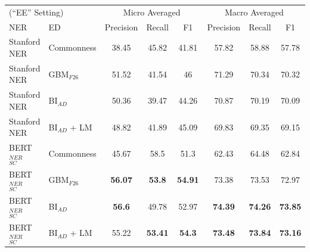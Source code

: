 \documentclass{report}
\theoremstyle{definition}
\theoremstyle{remark}
\begin{document}
\begin{table}[H]
    \vspace{0.5cm}\begin{tabular}{l l c c c| c c c}
    \multicolumn{2}{l}{(``EE'' Setting)}&\multicolumn{3}{c|}{Micro Averaged}&\multicolumn{3}{c}{Macro Averaged} \\
    NER & ED &Precision&Recall&F1&Precision&Recall&F1\\
    \hline
    Stanford NER & Commonness & 38.45&	45.82&41.81&	57.82&58.88&	57.78\\
   Stanford NER & GBM$_{F26}$ &51.52&	41.54&46	 & 71.29&70.34  & 70.32 \\
    Stanford NER & BI$_{AD}$ &50.36&	39.47&44.26&	70.87&70.19&	70.09\\
    Stanford NER & BI$_{AD}$ + LM&48.82&41.89&45.09&69.83&69.35&69.15\\
    BERT$_{SC}^{NER}$ & Commonness & 45.67&	58.5&51.3&	62.43&64.48&	62.84\\
    BERT$_{SC}^{NER}$ & GBM$_{F26}$ &\textbf{56.07}&	\textcolor{ao}{\textbf{53.8}}&\textcolor{ao}{\textbf{54.91}}&	73.38&73.53&	72.97 \\
    BERT$_{SC}^{NER}$ & BI$_{AD}$ &\textcolor{ao}{\textbf{56.6}}&	49.78&52.97&	\textcolor{ao}{\textbf{74.39}}&\textcolor{ao}{\textbf{74.26}}&	\textcolor{ao}{\textbf{73.85}}\\
    BERT$_{SC}^{NER}$ & BI$_{AD}$ + LM & 55.22&\textbf{53.41}&\textbf{54.3}&\textbf{73.48}&\textbf{73.84}&\textbf{73.16}\\
    \end{tabular}
    

\end{table}
\end{document}
